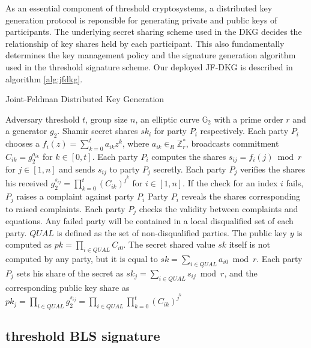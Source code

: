 \documentclass[11pt]{article}
\begin{document}
As an essential component of threshold cryptosystems, a distributed key generation protocol is reponsible for generating private and public keys of participants. The underlying secret sharing scheme used in the DKG decides the relationship of key shares held by each participant. This also fundamentally determines the key management policy and the signature generation algorithm used in the threshold signature scheme. Our deployed JF-DKG is described in algorithm \ref{alg:jfdkg}.

\begin{algorithm}
\caption{Joint-Feldman Distributed Key Generation \cite{gennaro2007secure}}\label{alg:jfdkg}
\begin{algorithmic}[1]
\Require Adversary threshold $t$, group size $n$, an elliptic curve $\mathbb{G}_2$ with a prime order $r$ and a generator $g_2$.
\Ensure Shamir secret shares $sk_i$ for party $P_i$ respectively.
\State Each party $P_i$ chooses a $f_i(z) = \sum_{k=0}^t a_{ik}z^{k}$, where $a_{ik} \in_R \mathbb{Z}_r^*$, broadcasts commitment $C_{ik} = g_2^{a_{ik}}$ for $k \in [0,t]$. Each party $P_i$ computes the shares $s_{ij} = f_i(j) \bmod r$ for $j \in [1,n]$ and sends $s_{ij}$ to party $P_j$ secretly.
\State Each party $P_j$ verifies the shares his received $g_2^{s_{ij}} = \prod_{k=0}^t(C_{ik})^{j^k}$ for $i \in [1,n]$. If the check for an index $i$ fails, $P_j$ raises a complaint against party $P_i$
\State Party $P_i$ reveals the shares corresponding to raised complaints. Each party $P_j$ checks the validity between complaints and equations. Any failed party will be contained in a local disqualified set of each party. $QUAL$ is defined as the set of non-disqualified parties.
\State The public key $y$ is computed as $pk = \prod_{i\in QUAL} C_{i0}$. The secret shared value $sk$ itself is not computed by any party, but it is equal to $sk = \sum_{i \in QUAL} a_{i0} \bmod r$. Each party $P_j$ sets his share of the secret as $sk_j = \sum_{i\in QUAL} s_{ij} \bmod r$, and the corresponding public key share as $pk_j = \prod_{i \in QUAL} g_2^{s_{ij}} = \prod_{i \in QUAL} \prod_{k=0}^t (C_{ik})^{j^k}$
\end{algorithmic}
\end{algorithm}

\subsection{threshold BLS signature}
\end{document}
